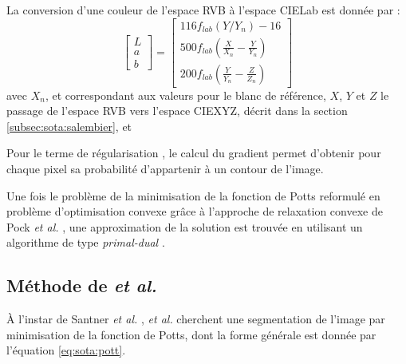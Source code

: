 La conversion d'une couleur de l'espace RVB à l'espace CIELab est donnée par :
\begin{equation}
\begin{bmatrix}
L \\ a \\ b
\end{bmatrix}
=
\begin{bmatrix}
 116f_{lab}(Y/Y_{n}) - 16 \\
 500f_{lab}(\frac{X}{X_{n}} - \frac{Y}{Y_{n}}) \\
 200f_{lab}(\frac{Y}{Y_{n}} - \frac{Z}{Z_{n}}) 
\end{bmatrix}
\end{equation}
avec $X_{n}$,  et  correspondant aux valeurs pour le blanc de référence, $X$, $Y$ et $Z$  le passage de  l'espace RVB vers l'espace CIEXYZ, décrit dans la section \ref{subsec:sota:salembier}, et 

Pour le terme de régularisation , le calcul du gradient permet d'obtenir pour chaque pixel sa probabilité d'appartenir à un contour de l'image. 
 
Une fois le problème de la minimisation de la fonction de Potts reformulé en problème d'optimisation convexe grâce  à l'approche de relaxation convexe de Pock \textit{et al.} \cite{pock2009convex}, une approximation de la solution est trouvée en utilisant un algorithme de type \emph{primal-dual} \cite{boyd2004convex}. 

\subsection{Méthode de  \textit{et al.}}
\label{subsec:sota:muller}
À l'instar de Santner \textit{et al.} \cite{santner2010interactive},  \textit{et al.} \cite{muller2016robust} cherchent une segmentation de l'image par minimisation de la fonction de Potts, dont la forme générale est donnée par l'équation \ref{eq:sota:pott}. 

